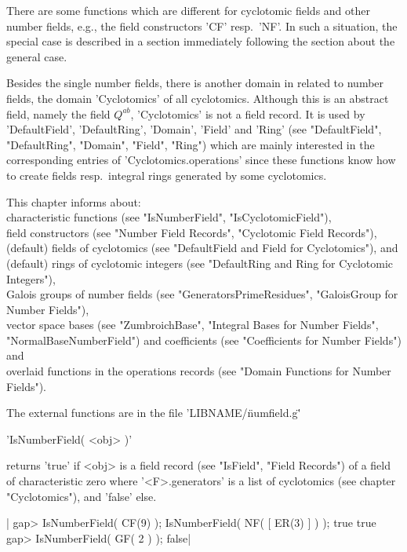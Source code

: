 There are some functions which are different for cyclotomic fields and
other number fields, e.g., the field constructors 'CF' resp.\ 'NF'.  In
such a situation, the special case is described in a section immediately
following the section about the general case.

Besides the single number fields, there is another domain in {\GAP}
related to number fields, the domain 'Cyclotomics' of all cyclotomics.
Although this is an abstract field, namely the field $Q^{ab}$,
'Cyclotomics' is not a field record.  It is used by 'DefaultField',
'DefaultRing', 'Domain', 'Field' and 'Ring' (see "DefaultField",
"DefaultRing", "Domain", "Field", "Ring") which are mainly interested in
the corresponding entries of 'Cyclotomics.operations' since these
functions know how to create fields resp.\ integral rings generated by
some cyclotomics.

This chapter informs about:\\
   characteristic functions (see "IsNumberField", "IsCyclotomicField"),\\
   field constructors (see "Number Field Records",
       "Cyclotomic Field Records"),\\
   (default) fields of cyclotomics
       (see "DefaultField and Field for Cyclotomics"),
       and (default) rings of cyclotomic integers
       (see "DefaultRing and Ring for Cyclotomic Integers"),\\
   Galois groups of number fields (see "GeneratorsPrimeResidues",
       "GaloisGroup for Number Fields"),\\
   vector space bases (see "ZumbroichBase",
       "Integral Bases for Number Fields", "NormalBaseNumberField") and
       coefficients (see "Coefficients for Number Fields") and\\
   overlaid functions in the operations records
       (see "Domain Functions for Number Fields").

The external functions are in the file 'LIBNAME/\"numfield.g\"'


'IsNumberField( <obj> )'

returns 'true' if <obj> is a field record (see "IsField", "Field
Records") of a field of characteristic zero where '<F>.generators' is a
list of cyclotomics (see chapter "Cyclotomics"), and 'false' else.

|    gap> IsNumberField( CF(9) ); IsNumberField( NF( [ ER(3) ] ) );
    true
    true
    gap> IsNumberField( GF( 2 ) );
    false|

